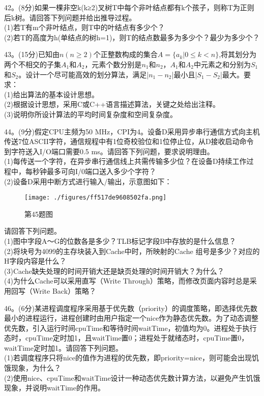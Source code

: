 42。(8分)如果一棵非空k(k≥2)叉树T中每个非叶结点都有k个孩子，则称T为正则后k树。请回答下列问题并给出推导过程。 \\
(1)若T有m个非叶结点，则T中的叶结点有多少个？ \\
(2)若T的高度为h(单结点的树h=1)，则T的结点数最多为多少个？最少为多少个？

43。(15分)已知由$n(n \geqslant 2)$个正整数构成的集合$A=\{a_k|0\leqslant k<n\}$,将其划分为两个不相交的子集$A_1$和$A_2$，元素个数分别是$n_1$和$n_2$，$A_1$和$A_2$中元素之和分别为$S_1$和$S_2$。设计一个尽可能高效的划分算法，满足|$n_1-n_2$|最小且|$S_1-S_2$|最大。要求： \\
(1)给出算法的基本设计思想。 \\
(2)根据设计思想，采用C或C++语言描述算法，关键之处给出注释。 \\
(3)说明你所设计算法的平均时间复杂度和空间复杂度。

44。(9分)假定CPU主频为50 MHz，CPI为4。设备D采用异步串行通信方式向主机传送7位ASCII字符，通信规程中有1位奇校验位和1位停止位，从D接收启动命令到字符送入I/O端口需要0.5 ms。请回答下列问题，要求说明理由。 \\
(1)每传送一个字符，在异步串行通信线上共需传输多少位？在设备D持续工作过程中，每秒钟最多可向I/0端口送入多少个字符？ \\
(2)设备D采用中断方式进行输入/输出，示意图如下：
\begin{figure}[ht]
\centering
\texttt{[image: ./figures/ff517de9608502fa.png]}
\caption{第45题图} \label{fig_CSN16_5}
\end{figure}
请回答下列问题。 \\
(1)图中字段A～G的位数各是多少？TLB标记字段B中存放的是什么信息？ \\
(2)将块号为4099的主存块装入到Cache中时，所映射的Cache 组号是多少？对应的H字段内容是什么？ \\
(3)Cache缺失处理的时间开销大还是缺页处理的时间开销大？为什么？ \\
(4)为什么Cache可以采用直写（Write Through）策略，而修改页面内容时总是采用回写（Write Back）策略？

46。(6分)某进程调度程序采用基于优先数（priority）的调度策略，即选择优先数最小的进程运行，进程创建时由用户指定一个nice作为静态优先数。为了动态调整优先数，引入运行时间cpuTime和等待时间waitTime，初值均为0。进程处于执行态时，cpuTime定时加1，且waitTime置0；进程处于就绪态时，cpuTime置0，waitTime定时加1。请回答下列问题。 \\
(1)若调度程序只将nice的值作为进程的优先数，即priority=nice，则可能会出现饥饿现象，为什么？ \\
(2)使用nice、cpuTime和waitTime设计一种动态优先数计算方法，以避免产生饥饿现象，并说明waitTime的作用。

